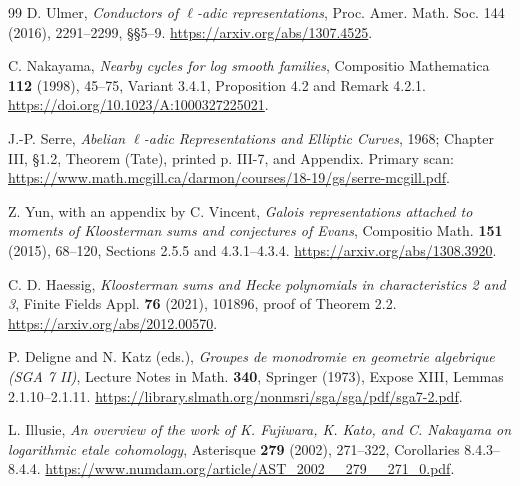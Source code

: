 \begin{thebibliography}{99}
 D. Ulmer, \emph{Conductors of $\ell$-adic representations},
Proc. Amer. Math. Soc. 144 (2016), 2291--2299, \S\S5--9.
\url{https://arxiv.org/abs/1307.4525}.

 C. Nakayama, \emph{Nearby cycles for log smooth families},
Compositio Mathematica \textbf{112} (1998), 45--75,
Variant 3.4.1, Proposition 4.2 and Remark 4.2.1.
\url{https://doi.org/10.1023/A:1000327225021}.

 J.-P. Serre, \emph{Abelian $\ell$-adic Representations and
Elliptic Curves}, 1968; Chapter III, \S1.2, Theorem (Tate), printed p. III-7,
and Appendix. Primary scan:
\url{https://www.math.mcgill.ca/darmon/courses/18-19/gs/serre-mcgill.pdf}.

 Z. Yun, with an appendix by C. Vincent,
\emph{Galois representations attached to moments of Kloosterman sums and
conjectures of Evans}, Compositio Math. \textbf{151} (2015), 68--120,
Sections 2.5.5 and 4.3.1--4.3.4.
\url{https://arxiv.org/abs/1308.3920}.

 C. D. Haessig,
\emph{Kloosterman sums and Hecke polynomials in characteristics 2 and 3},
Finite Fields Appl. \textbf{76} (2021), 101896, proof of Theorem 2.2.
\url{https://arxiv.org/abs/2012.00570}.

 P. Deligne and N. Katz (eds.),
\emph{Groupes de monodromie en geometrie algebrique (SGA 7 II)},
Lecture Notes in Math. \textbf{340}, Springer (1973),
Expose XIII, Lemmas 2.1.10--2.1.11.
\url{https://library.slmath.org/nonmsri/sga/sga/pdf/sga7-2.pdf}.

 L. Illusie, \emph{An overview of the work of K. Fujiwara,
K. Kato, and C. Nakayama on logarithmic etale cohomology}, Asterisque
\textbf{279} (2002), 271--322, Corollaries 8.4.3--8.4.4.
\url{https://www.numdam.org/article/AST_2002__279__271_0.pdf}.
\end{thebibliography}
